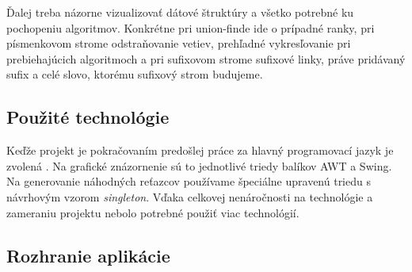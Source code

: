 Ďalej treba názorne vizualizovať dátové štruktúry a všetko potrebné ku 
pochopeniu algoritmov. Konkrétne pri union-finde ide o prípadné ranky, 
pri písmenkovom strome odstraňovanie vetiev, prehľadné vykresľovanie pri 
prebiehajúcich algoritmoch a pri sufixovom strome sufixové linky, práve 
pridávaný sufix a celé slovo, ktorému sufixový strom budujeme.

\subsection{Použité technológie}

Keďže projekt je pokračovaním predošlej práce za hlavný programovací jazyk je 
zvolená \Java. Na grafické znázornenie sú to jednotlivé triedy balíkov AWT a 
Swing. Na generovanie náhodných reťazcov používame špeciálne upravenú triedu 
s návrhovým vzorom \emph{singleton}. Vďaka celkovej nenáročnosti na 
technológie a zameraniu projektu nebolo potrebné použiť viac technológií.

\subsection{Rozhranie aplikácie}




